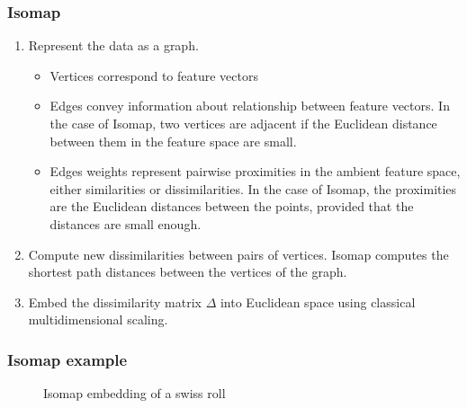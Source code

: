 \documentclass[professionalfonts,hyperref={colorlinks=true,linkcolor=red}]{beamer}
\begin{document}
\begin{frame}
  \frametitle{Isomap}
  \begin{enumerate}
  \item<2-> Represent the data as a graph. 
    \begin{itemize}
    \item<3-> Vertices correspond to feature vectors
    \item<3-> Edges convey information about relationship between
      feature vectors. In the case of Isomap, two vertices are
      adjacent if the Euclidean distance between them in the feature
      space are small. 
    \item<3-> Edges weights represent pairwise proximities in the
      ambient feature space, either similarities or
      dissimilarities. In the case of Isomap, the proximities are the
      Euclidean distances between the points, provided that the
      distances are small enough.
    \end{itemize}
  \item<4-> Compute new dissimilarities between pairs of
    vertices. Isomap computes the shortest path distances between the
    vertices of the graph. 
  \item<5-> Embed the dissimilarity matrix $\Delta$ into Euclidean
    space using classical multidimensional scaling. 
  \end{enumerate}
\end{frame}
\begin{frame}[label=isomap_example]
  \frametitle{Isomap example}
  \subfiglabelskip=0pt
  \begin{figure}[htbp]
    \label{fig:swissroll}
    \centering
    \hspace{3pt}
    \caption{Isomap embedding of a swiss roll}
  \end{figure}
\end{frame}
\end{document}
